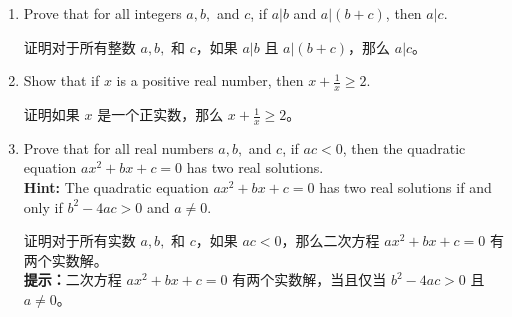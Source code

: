 \begin{enumerate}
{    这可以通过从结论倒推的方法非常容易地得出。记住，当不等式两边同时乘以或除以某个数时，不等号的方向可能会改变（除非我们知道所涉及的数是正数）。另外，记住我们不能除以零，所以如果我们（举个例子，真的不知道我为什么要提这个……）将不等式两边同时除以 $x^2$，那么我们必须单独处理 $x=0$ 的情况。}
    
    \wbvfill
    
    \item Prove that for all integers $a,b,$ and $c$, if $a|b$ and $a|(b+c)$, then
    $a|c$.
    
    证明对于所有整数 $a,b,$ 和 $c$，如果 $a|b$ 且 $a|(b+c)$，那么 $a|c$。
    \wbvfill
    
    \workbookpagebreak
    
    \item Show that if $x$ is a positive real number, then $x+\frac{1}{x} \geq 2$.
    
    证明如果 $x$ 是一个正实数，那么 $x+\frac{1}{x} \geq 2$。
    
    \wbvfill
    
    \item Prove that for all real numbers $a,b,$ and $c$, if $ac<0$, then the quadratic
    equation $ax^{2}+bx+c=0$ has two real solutions.\\
    \textbf{Hint:} The quadratic equation $ax^{2}+bx+c=0$ has two
    real solutions if and only if $b^{2}-4ac>0$ and $a\neq0$.
    
    证明对于所有实数 $a,b,$ 和 $c$，如果 $ac<0$，那么二次方程 $ax^{2}+bx+c=0$ 有两个实数解。\\
    \textbf{提示：}二次方程 $ax^{2}+bx+c=0$ 有两个实数解，当且仅当 $b^{2}-4ac>0$ 且 $a\neq0$。
\end{enumerate}

